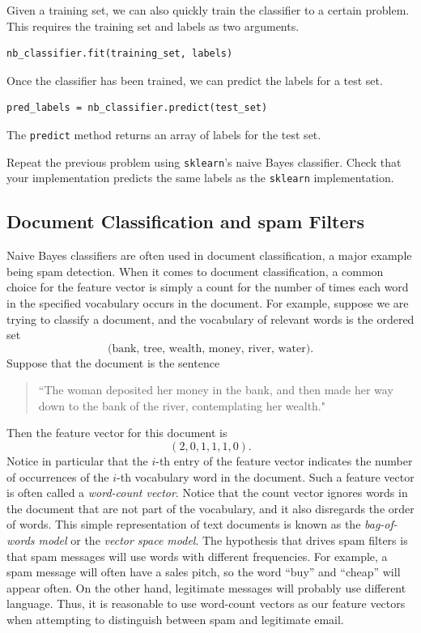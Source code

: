 Given a training set, we can also quickly train the classifier to a certain problem.
This requires the training set and labels as two arguments.

\begin{lstlisting}
nb_classifier.fit(training_set, labels)
\end{lstlisting}

Once the classifier has been trained, we can predict the labels for a test set.

\begin{lstlisting}
pred_labels = nb_classifier.predict(test_set)
\end{lstlisting}

The {\tt predict} method returns an array of labels for the test set.

\begin{problem}

Repeat the previous problem using {\tt sklearn}'s naive Bayes classifier.
Check that your implementation predicts the same labels as the {\tt sklearn}
implementation.

\end{problem}


\subsection*{Document Classification and spam Filters}

Naive Bayes classifiers are often used in document classification, a major example being spam detection.
When it comes to document classification, a common choice for the feature vector
is simply a count for the number of times each word in the specified vocabulary occurs in the document.
For example, suppose we are trying to classify a document, and the vocabulary of relevant words is the ordered set
\[
\text{(bank, tree, wealth, money, river, water)}. 
\]
Suppose that the document is the sentence 
\begin{quotation}
``The woman deposited her money in the bank, and then made her way down to the bank of the river, contemplating her wealth."
\end{quotation}
Then the feature vector for this document is
\[
(2, 0, 1, 1, 1, 0).
\]
Notice in particular that the $i$-th entry of the feature vector indicates the number of occurrences of the $i$-th 
vocabulary word in the document.
Such a feature vector is often called a \emph{word-count vector}. 
Notice that the count vector ignores words in the document that are not part of the vocabulary, and 
it also disregards the order of words.
This simple representation of text documents is known as the \emph{bag-of-words model} or the \emph{vector space model}.
The hypothesis that drives spam filters is that spam messages will use words with different frequencies.
For example, a spam message will often have a sales pitch, so the word ``buy'' and ``cheap'' will appear often.
On the other hand, legitimate messages will probably use different language.
Thus, it is reasonable to use word-count vectors as our feature vectors when attempting to distinguish between spam and
legitimate email. 

